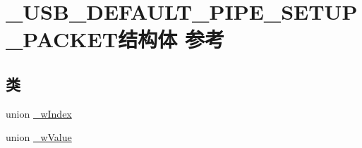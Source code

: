 \hypertarget{struct___u_s_b___d_e_f_a_u_l_t___p_i_p_e___s_e_t_u_p___p_a_c_k_e_t}{}\section{\+\_\+\+U\+S\+B\+\_\+\+D\+E\+F\+A\+U\+L\+T\+\_\+\+P\+I\+P\+E\+\_\+\+S\+E\+T\+U\+P\+\_\+\+P\+A\+C\+K\+E\+T结构体 参考}
\label{struct___u_s_b___d_e_f_a_u_l_t___p_i_p_e___s_e_t_u_p___p_a_c_k_e_t}
\subsection*{类}
\begin{DoxyCompactItemize}
\item 
union \hyperlink{union___u_s_b___d_e_f_a_u_l_t___p_i_p_e___s_e_t_u_p___p_a_c_k_e_t_1_1__w_index}{\+\_\+w\+Index}
\item 
union \hyperlink{union___u_s_b___d_e_f_a_u_l_t___p_i_p_e___s_e_t_u_p___p_a_c_k_e_t_1_1__w_value}{\+\_\+w\+Value}
\end{DoxyCompactItemize}
